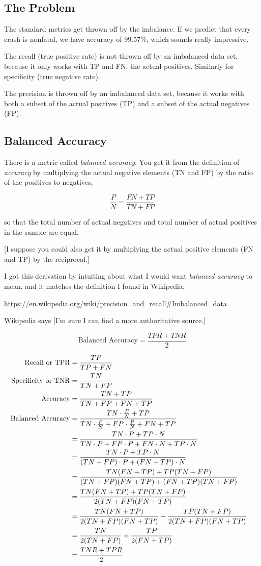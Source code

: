 \documentclass[11pt]{article}
\begin{document}
\begin{spacing}{1.2}
\subsection{The Problem}

The standard metrics get thrown off by the imbalance.  If we predict that every crash is nonfatal, we have accuracy of 99.57\%, which sounds really impressive.  

The recall (true positive rate) is not thrown off by an imbalanced data set, because it only works with TP and FN, the actual positives.  Similarly for specificity (true negative rate).

The precision is thrown off by an imbalanced data set, because it works with both a subset of the actual positives (TP) and a subset of the actual negatives (FP).  

\subsection{Balanced Accuracy}

There is a metric called {\it balanced accuracy}.  You get it from the definition of {\it accuracy} by multiplying the actual negative elements (TN and FP) by the ratio of the positives to negatives, 

$$\frac{P}{N} = \frac{FN+TP}{TN+FP}$$

so that the total number of actual negatives and total number of actual positives in the sample are equal.

[I suppose you could also get it by multiplying the actual positive elements (FN and TP) by the reciprocal.]

I got this derivation by intuiting about what I would want {\it balanced accuracy} to mean, and it matches the definition I found in Wikipedia.  

\url{https://en.wikipedia.org/wiki/precision_and_recall#Imbalanced_data}

Wikipedia says [I'm sure I can find a more authoritative source.]

$$\text{Balanced Accuracy} = \frac{TPR + TNR}{2}$$

\begin{align*}
	\text{Recall or TPR} &= \frac{TP}{TP+FN} \cr
	\text{Specificity or TNR} &= \frac{TN}{TN+FP} \cr
	\text{Accuracy} &= \frac{TN+TP}{TN+FP+FN+TP} \cr
	\text{Balanced Accuracy} &=  \frac{TN \cdot \frac{P}{N}+TP}{TN \cdot \frac{P}{N}+FP \cdot \frac{P}{N}+FN+TP} \cr
		&= \frac{TN \cdot P+TP \cdot N}{TN \cdot P+FP \cdot P+FN \cdot N+TP\cdot N} \cr
	&= \frac{TN \cdot P+TP \cdot N}{(TN+FP) \cdot P+(FN+TP) \cdot  N} \cr
	&= \frac{TN (FN+TP)+TP (TN+FP)}{(TN+FP) (FN+TP)+(FN+TP) (TN+FP)} \cr
	&= \frac{TN (FN+TP)+TP (TN+FP)}{2(TN+FP) (FN+TP)} \cr
	&= \frac{TN (FN+TP)}{2(TN+FP) (FN+TP)}  + \frac{TP (TN+FP)}{2(TN+FP) (FN+TP)} \cr
	&= \frac{TN}{2(TN+FP) }  + \frac{TP }{2 (FN+TP)} \cr
	&= \frac{TNR+TPR}{2} \cr
\end{align*}


\end{spacing}
\end{document}
